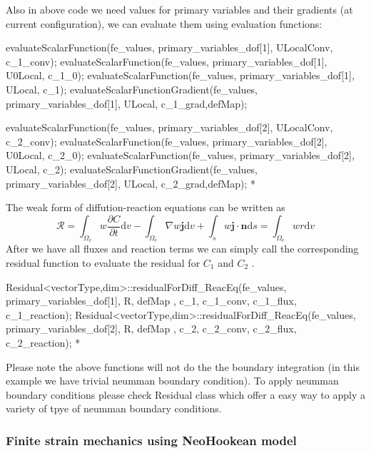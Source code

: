  Also in above code we need values for primary variables and their gradients (at current configuration), we can evaluate them using {\ttfamily evaluation} {\ttfamily functions\-:} 
\begin{DoxyCode}
            evaluateScalarFunction(fe\_values, primary\_variables\_dof[1], ULocalConv, c\_1\_conv);
            evaluateScalarFunction(fe\_values, primary\_variables\_dof[1], U0Local, c\_1\_0);
            evaluateScalarFunction(fe\_values, primary\_variables\_dof[1], ULocal, c\_1);   
            evaluateScalarFunctionGradient(fe\_values, primary\_variables\_dof[1], ULocal, c\_1\_grad,defMap);
            
            evaluateScalarFunction(fe\_values, primary\_variables\_dof[2], ULocalConv, c\_2\_conv);
            evaluateScalarFunction(fe\_values, primary\_variables\_dof[2], U0Local, c\_2\_0);
            evaluateScalarFunction(fe\_values, primary\_variables\_dof[2], ULocal, c\_2);   
            evaluateScalarFunctionGradient(fe\_values, primary\_variables\_dof[2], ULocal, c\_2\_grad,defMap);
*
\end{DoxyCode}
 The weak form of diffution-\/reaction equations can be written as \[ \mathscr{R}=\int_{\Omega_{\text{e}}}w\frac{\partial C}{\partial t}\text{d}v-\int_{\Omega_{\text{e}}} \nabla w \boldsymbol{j} \text{d}v+\int_{s}w\boldsymbol{j}\cdot\boldsymbol{n} \text{d}s=\int_{\Omega_{\text{e}}}w r \text{d}v \] After we have all fluxes and reaction terms we can simply call the corresponding residual function to evaluate the residual for $C_\text{1}$ and $C_\text{2}$ . 
\begin{DoxyCode}
            Residual<vectorType,dim>::residualForDiff_ReacEq(fe\_values, primary\_variables\_dof[1], R, defMap
      , c\_1, c\_1\_conv, c\_1\_flux, c\_1\_reaction);
            Residual<vectorType,dim>::residualForDiff_ReacEq(fe\_values, primary\_variables\_dof[2], R, defMap
      , c\_2, c\_2\_conv, c\_2\_flux, c\_2\_reaction);
*
\end{DoxyCode}
 Please note the above functions will not do the the boundary integration (in this example we have trivial neumman boundary condition). To apply neumman boundary conditions please check {\ttfamily Residual} class which offer a easy way to apply a variety of tpye of neumman boundary conditions. \hypertarget{_intercalation_mechanics}{}\subsubsection{Finite strain mechanics using Neo\-Hookean model}\label{_intercalation_mechanics}

